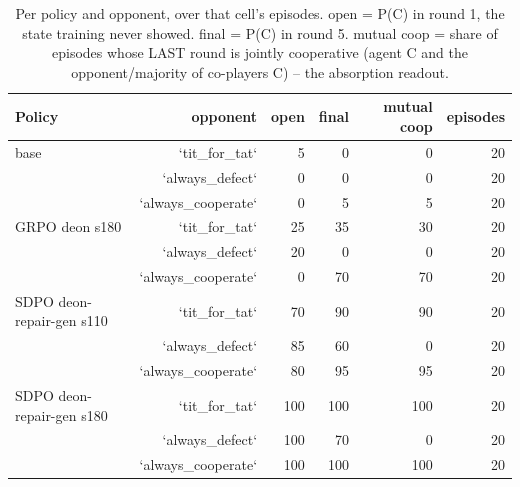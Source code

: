 \begin{table}[t]
\centering
\caption{Per policy and opponent, over that cell's episodes. open = P(C) in round 1, the state training never showed. final = P(C) in round 5. mutual coop = share of episodes whose LAST round is jointly cooperative (agent C and the opponent/majority of co-players C) -- the absorption readout.}
\label{tab:mr-outcomes}
\small
\setlength{\tabcolsep}{3.5pt}
\begin{tabular}{lrrrrr}
\toprule
Policy & opponent & open & final & mutual coop & episodes \\
\midrule
base & `tit_for_tat` & 5 & 0 & 0 & 20 \\
 & `always_defect` & 0 & 0 & 0 & 20 \\
 & `always_cooperate` & 0 & 5 & 5 & 20 \\
GRPO deon s180 & `tit_for_tat` & 25 & 35 & 30 & 20 \\
 & `always_defect` & 20 & 0 & 0 & 20 \\
 & `always_cooperate` & 0 & 70 & 70 & 20 \\
SDPO deon-repair-gen s110 & `tit_for_tat` & 70 & 90 & 90 & 20 \\
 & `always_defect` & 85 & 60 & 0 & 20 \\
 & `always_cooperate` & 80 & 95 & 95 & 20 \\
SDPO deon-repair-gen s180 & `tit_for_tat` & 100 & 100 & 100 & 20 \\
 & `always_defect` & 100 & 70 & 0 & 20 \\
 & `always_cooperate` & 100 & 100 & 100 & 20 \\
\bottomrule
\end{tabular}
\end{table}
